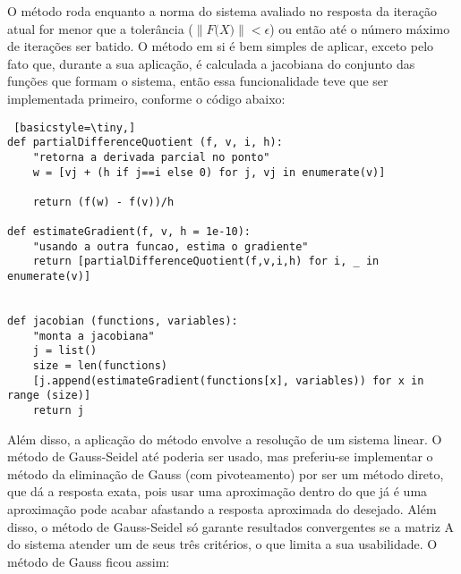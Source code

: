 \documentclass[12pt,A4]{report}
\begin{document}
O método roda enquanto a norma do sistema avaliado no resposta da iteração atual  for menor que a tolerância ($\|\textit{F(X)}\| < \epsilon$) ou então até o número máximo de iterações ser batido. O método em si é bem simples de aplicar, exceto pelo fato que, durante a sua aplicação, é calculada a jacobiana do conjunto das funções que formam o sistema, então essa funcionalidade teve que ser implementada primeiro, conforme o código abaixo:

\begin{lstlisting} [basicstyle=\tiny,]
def partialDifferenceQuotient (f, v, i, h):
    "retorna a derivada parcial no ponto"
    w = [vj + (h if j==i else 0) for j, vj in enumerate(v)]
    
    return (f(w) - f(v))/h

def estimateGradient(f, v, h = 1e-10):
    "usando a outra funcao, estima o gradiente"
    return [partialDifferenceQuotient(f,v,i,h) for i, _ in enumerate(v)]


def jacobian (functions, variables):
    "monta a jacobiana"
    j = list()
    size = len(functions)
    [j.append(estimateGradient(functions[x], variables)) for x in range (size)]
    return j
\end{lstlisting}

Além disso, a aplicação do método envolve a resolução de um sistema linear. O método de Gauss-Seidel até poderia ser usado, mas preferiu-se implementar o método da eliminação de Gauss (com pivoteamento) por ser um método direto, que dá a resposta exata, pois usar uma aproximação dentro do que já é uma aproximação pode acabar afastando a resposta aproximada do desejado. Além disso, o método de Gauss-Seidel só garante resultados convergentes se a matriz A do sistema atender um de seus três critérios, o que limita a sua usabilidade. O método de Gauss ficou assim:
\end{document}
